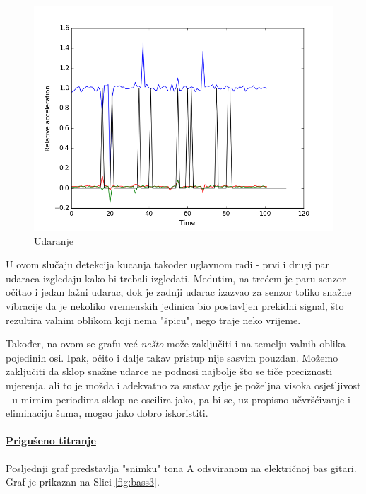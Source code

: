 \documentclass[12pt,a4paper]{article}
\begin{document}
	\begin{figure}[h!]
	  \includegraphics[width=\linewidth]{slike/aggro.png}
	  \caption{Udaranje}
	  \label{fig:aggro}
	\end{figure}

	U ovom slučaju detekcija kucanja također uglavnom radi - prvi i drugi par udaraca izgledaju kako bi trebali izgledati. Međutim, na trećem je paru senzor očitao i jedan lažni udarac, dok je zadnji udarac izazvao za senzor toliko snažne vibracije da je nekoliko vremenskih jedinica bio postavljen prekidni signal, što rezultira valnim oblikom koji nema "špicu", nego traje neko vrijeme.
	\par Također, na ovom se grafu već \textit{nešto} može zaključiti i na temelju valnih oblika pojedinih osi. Ipak, očito i dalje takav pristup nije sasvim pouzdan. Možemo zaključiti da sklop snažne udarce ne podnosi najbolje što se tiče preciznosti mjerenja, ali to je možda i adekvatno za sustav gdje je poželjna visoka osjetljivost - u mirnim periodima sklop ne oscilira jako, pa bi se, uz propisno učvršćivanje i eliminaciju šuma, mogao jako dobro iskoristiti.


	\newpage
	\paragraph{\underline{Prigušeno titranje}} %
	\label{par:bass}
	Posljednji graf predstavlja "snimku" tona A odsviranom na električnoj bas gitari. Graf je prikazan na Slici \ref{fig:bass3}.
\end{document}
